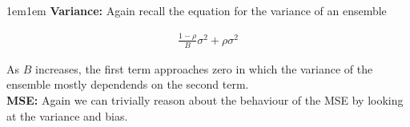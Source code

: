 \documentclass[11pt]{article}
\begin{document}
\begin{adjustwidth}{1em}{1em}
        \textbf{Variance:} Again recall the equation for the variance of an ensemble

        \begin{align*}
            \frac{1 - \rho}{B}\sigma^2 + \rho \sigma^2
        \end{align*}

        As $B$ increases, the first term approaches zero in which the variance of the ensemble
        mostly dependends on the second term. \\ 

        \textbf{MSE:} Again we can trivially reason about the behaviour of the MSE by looking at the
        variance and bias.
    \end{adjustwidth}
\end{document}
